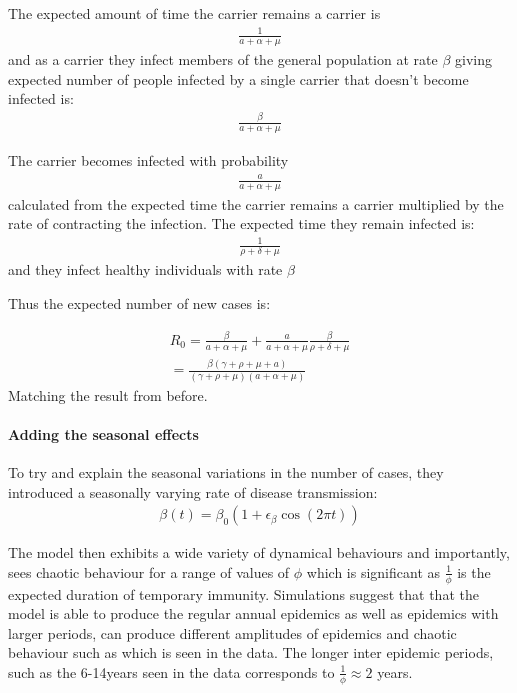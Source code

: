 \documentclass[11pt]{article} %
\begin{document}
The expected amount of time the carrier remains a carrier is
 \begin{eqnarray}
\frac{1}{a+\alpha+\mu}
\end{eqnarray}
and as a carrier they infect members of the general population at rate $ \beta $ giving expected number of people infected by a single carrier that doesn't become infected is:
 \begin{eqnarray}
\frac{\beta}{a+\alpha+\mu}
\end{eqnarray}

The carrier becomes infected with probability 
 \begin{eqnarray}
\frac{a}{a+\alpha+\mu}
\end{eqnarray}
calculated from the expected time the carrier remains a carrier multiplied by the rate of contracting the infection. The expected time they remain infected is: 
 \begin{eqnarray}
\frac{1}{\rho+\delta+\mu }
\end{eqnarray}
and they infect healthy individuals with rate $\beta  $

Thus the expected number of new cases is: 

\begin{eqnarray}
R_0=\frac{\beta}{a+\alpha+\mu}+\frac{a}{a+\alpha+\mu}\frac{\beta}{\rho+\delta+\mu }\\
=\frac{\beta(\gamma+\rho+\mu+a)}{(\gamma+\rho+\mu)(a+\alpha+\mu )}
\end{eqnarray}
Matching the result from before.

\paragraph{Adding the seasonal effects  }


To try and explain the seasonal variations in the number of cases, they introduced a seasonally varying rate of disease transmission:
\begin{eqnarray}
\beta(t)=\beta_0(1+\epsilon_\beta \cos(2\pi t))
\end{eqnarray}
	
The model then exhibits a wide variety of dynamical behaviours and importantly, sees chaotic behaviour for a range of values of $\phi$ which is significant as $\frac{1}{\phi}$ is the expected duration of temporary immunity. Simulations suggest that that the model is able to produce the regular annual epidemics as well as epidemics with larger periods, can produce different amplitudes of epidemics and chaotic behaviour such as which is seen in the data. The longer inter epidemic periods, such as the 6-14years seen in the data corresponds to $\frac{1}{\phi}\approx 2 $ years.  
\end{document}
